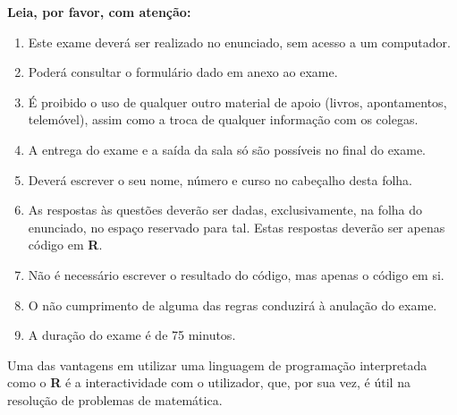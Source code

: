 \documentclass[addpoints]{exam}
\begin{document}
{{\large\textbf{Leia, por favor, com atenção:}}
\begin{enumerate}
	\item Este exame deverá ser realizado no enunciado, sem acesso a um computador.
	\item Poderá consultar o formulário dado em anexo ao exame.
	\item É proibido o uso de qualquer outro material de apoio (livros, apontamentos, telemóvel), assim como a troca de qualquer informação com os colegas.
	\item A entrega do exame e a saída da sala só são possíveis no final do exame.
	\item Deverá escrever o seu nome, número e curso no cabeçalho desta folha.
	\item As respostas às questões deverão ser dadas, exclusivamente, na folha do enunciado, no espaço reservado para tal. Estas respostas deverão ser apenas código em \textbf{R}.
	\item Não é necessário escrever o resultado do código, mas apenas o código em si.
	\item O não cumprimento de alguma das regras conduzirá à anulação do exame.
	\item A duração do exame é de 75 minutos.
\end{enumerate}

\vspace{10mm}

\begin{questions}
	\question Uma das vantagens em utilizar uma linguagem de programação interpretada como o \textbf{R} é a interactividade com o utilizador, que, por sua vez, é útil na resolução de problemas de matemática.
	
\end{questions}}
\end{document}
